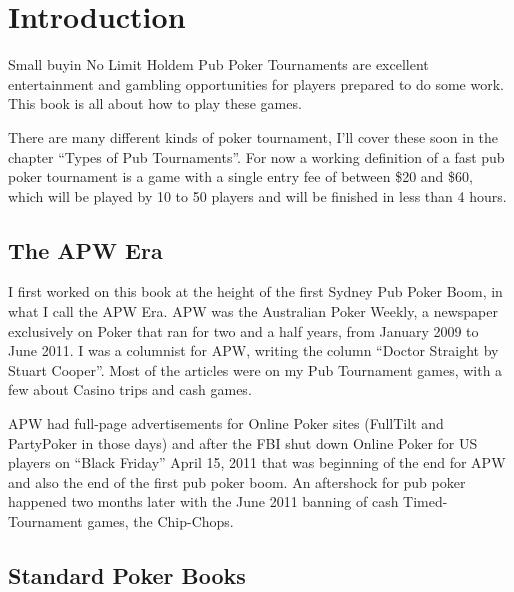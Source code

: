 \chapter{Introduction}


Small buyin No Limit Holdem Pub Poker Tournaments are excellent
entertainment and gambling opportunities for players prepared to do
some work. This book is all about how to play these games.

There are many different kinds of poker tournament, I'll cover these
soon in the chapter ``Types of Pub Tournaments''. For now a
working definition of a fast
pub poker tournament is a game with a single entry fee of
between \$20 and \$60, which will be played by 10 to 50
players and will be finished in less than 4 hours.


\section{The APW Era}

I first worked on this book at the height of the first Sydney Pub
Poker Boom, in what I call the APW Era. APW was the Australian Poker
Weekly, a newspaper exclusively on Poker that ran for two and a half years,
from January 2009 to June 2011. I was a columnist for APW, writing the
column ``Doctor Straight by Stuart Cooper''. Most of the articles were
on my Pub Tournament games, with a few about Casino trips and cash games.

APW had full-page advertisements for Online Poker sites (FullTilt
and PartyPoker in those days) and after the FBI shut down Online Poker
for US players on ``Black Friday'' April 15, 2011 that was beginning
of the end for APW and also the end of the first pub poker boom. An
aftershock for pub poker happened two months later with the June 2011
banning of cash Timed-Tournament games, the Chip-Chops.

\section{Standard Poker Books}

